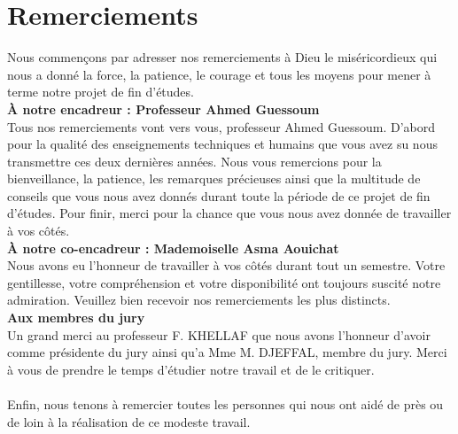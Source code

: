 \chapter*{Remerciements} %

Nous commençons par adresser nos remerciements à Dieu le miséricordieux qui nous a donné la force, la patience, le courage et tous les moyens pour mener à terme notre projet de fin d'études. \\

\textbf{À notre encadreur : Professeur Ahmed Guessoum}
\\

Tous nos remerciements vont vers vous, professeur Ahmed Guessoum. D’abord pour la qualité des enseignements techniques et humains que vous avez su nous transmettre ces deux dernières années. Nous vous remercions pour la bienveillance, la patience, les remarques précieuses ainsi que la multitude de conseils que vous nous avez donnés durant toute la période de ce projet de fin d’études. Pour finir, merci pour la chance que vous nous avez donnée de travailler à vos côtés.
\\

\textbf{À notre co-encadreur : Mademoiselle Asma Aouichat}
\\

Nous avons eu l’honneur de travailler à vos côtés durant tout un semestre. Votre gentillesse, votre compréhension et votre disponibilité ont toujours suscité notre admiration. Veuillez bien recevoir nos remerciements les plus distincts. \\

\textbf{Aux membres du jury} \\

Un grand merci au professeur F. KHELLAF que nous avons l'honneur d'avoir comme présidente du jury ainsi qu'a Mme M. DJEFFAL, membre du jury. Merci à vous de prendre le temps d'étudier notre travail et de le critiquer. \\ \\
Enfin, nous tenons à remercier toutes les personnes qui nous ont aidé de près ou de loin à la réalisation de ce modeste travail. 


